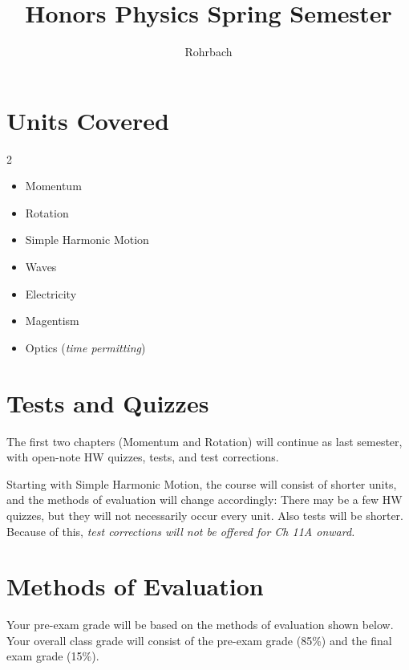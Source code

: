 \documentclass[10pt]{exam}
\title{Honors Physics Spring Semester}
\author{Rohrbach}
\begin{document}
\maketitle


\section*{Units Covered}

\begin{multicols}{2}
  \begin{itemize}
    \item Momentum
    \item Rotation
    \item Simple Harmonic Motion 
    \item Waves
    \item Electricity
    \item Magentism
    \item Optics (\emph{time permitting})
  \end{itemize}
\end{multicols}


\section*{Tests and Quizzes}

The first two chapters (Momentum and Rotation) will continue as last semester, with open-note HW quizzes, tests, and test corrections.  

Starting with Simple Harmonic Motion, the course will consist of shorter units, and the methods of evaluation will change accordingly: There may be a few HW quizzes, but they will not necessarily occur every unit.  Also tests will be shorter.  Because of this, \emph{test corrections will not be offered for Ch 11A onward.}

\vspace{-.4em}


\section*{Methods of Evaluation}

Your pre-exam grade will be based on the methods of 
evaluation shown below. Your overall class 
grade will consist of the pre-exam grade (85\%) and the
final exam grade (15\%).
\end{document}
